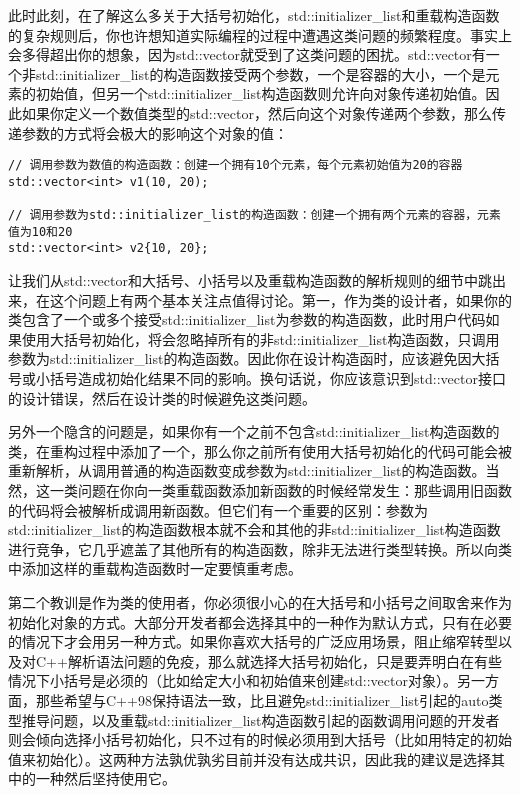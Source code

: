 此时此刻，在了解这么多关于大括号初始化，std::initializer\_list和重载构造函数的复杂规则后，你也许想知道实际编程的过程中遭遇这类问题的频繁程度。事实上会多得超出你的想象，因为std::vector就受到了这类问题的困扰。std::vector有一个非std::initializer\_list的构造函数接受两个参数，一个是容器的大小，一个是元素的初始值，但另一个std::initializer\_list构造函数则允许向对象传递初始值。因此如果你定义一个数值类型的std::vector，然后向这个对象传递两个参数，那么传递参数的方式将会极大的影响这个对象的值：

\begin{lstlisting}
// 调用参数为数值的构造函数：创建一个拥有10个元素，每个元素初始值为20的容器
std::vector<int> v1(10, 20); 	

// 调用参数为std::initializer_list的构造函数：创建一个拥有两个元素的容器，元素值为10和20
std::vector<int> v2{10, 20}; 	
\end{lstlisting}

让我们从std::vector和大括号、小括号以及重载构造函数的解析规则的细节中跳出来，在这个问题上有两个基本关注点值得讨论。第一，作为类的设计者，如果你的类包含了一个或多个接受std::initializer\_list为参数的构造函数，此时用户代码如果使用大括号初始化，将会忽略掉所有的非std::initializer\_list构造函数，只调用参数为std::initializer\_list的构造函数。因此你在设计构造函时，应该避免因大括号或小括号造成初始化结果不同的影响。换句话说，你应该意识到std::vector接口的设计错误，然后在设计类的时候避免这类问题。

另外一个隐含的问题是，如果你有一个之前不包含std::initializer\_list构造函数的类，在重构过程中添加了一个，那么你之前所有使用大括号初始化的代码可能会被重新解析，从调用普通的构造函数变成参数为std::initializer\_list的构造函数。当然，这一类问题在你向一类重载函数添加新函数的时候经常发生：那些调用旧函数的代码将会被解析成调用新函数。但它们有一个重要的区别：参数为std::initializer\_list的构造函数根本就不会和其他的非std::initializer\_list构造函数进行竞争，它几乎遮盖了其他所有的构造函数，除非无法进行类型转换。所以向类中添加这样的重载构造函数时一定要慎重考虑。

第二个教训是作为类的使用者，你必须很小心的在大括号和小括号之间取舍来作为初始化对象的方式。大部分开发者都会选择其中的一种作为默认方式，只有在必要的情况下才会用另一种方式。如果你喜欢大括号的广泛应用场景，阻止缩窄转型以及对C++解析语法问题的免疫，那么就选择大括号初始化，只是要弄明白在有些情况下小括号是必须的（比如给定大小和初始值来创建std::vector对象）。另一方面，那些希望与C++98保持语法一致，比且避免std::initializer\_list引起的auto类型推导问题，以及重载std::initializer\_list构造函数引起的函数调用问题的开发者则会倾向选择小括号初始化，只不过有的时候必须用到大括号（比如用特定的初始值来初始化）。这两种方法孰优孰劣目前并没有达成共识，因此我的建议是选择其中的一种然后坚持使用它。

